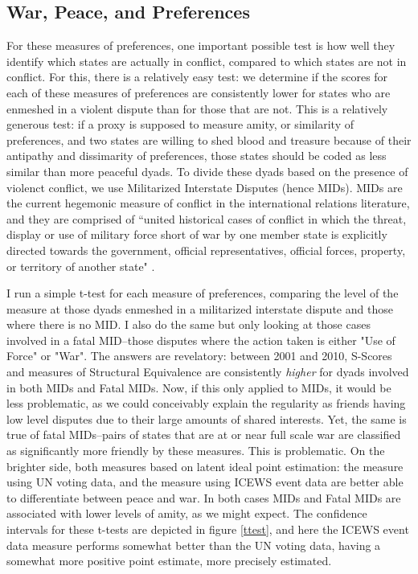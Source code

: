 \documentclass[12pt,onesided,fullpage]{amsart}
\begin{document}
\subsection{War, Peace, and Preferences}
For these measures of preferences, one important possible test is how well they identify which states are actually in conflict, compared to which states are not in conflict. For this, there is a relatively easy test: we determine if the scores for each of these measures of preferences are consistently lower for states who are enmeshed in a violent dispute than for those that are not. This is a relatively generous test: if a proxy is supposed to measure amity, or similarity of preferences, and two states are willing to shed blood and treasure because of their antipathy and dissimarity of preferences, those states should be coded as less similar than more peaceful dyads. To divide these dyads based on the presence of violenct conflict, we use Militarized Interstate Disputes (hence MIDs). MIDs are the current hegemonic measure of conflict in the international relations literature, and they are comprised of ``united historical cases of conflict in which the threat, display or use of military force short of war  by one member state is explicitly directed towards the government, official representatives, official forces, property, or territory of another state" \citep{mids}.

I run a simple t-test for each measure of preferences, comparing the level of the measure at those dyads enmeshed in a militarized interstate dispute and those where there is no MID. I also do the same but only looking at those cases involved in a fatal MID--those disputes where the action taken is either "Use of Force" or "War". The answers are revelatory: between 2001 and 2010, S-Scores and measures of Structural Equivalence are consistently \emph{higher} for dyads involved in both MIDs and Fatal MIDs. Now, if this only applied to MIDs, it would be less problematic, as we could conceivably explain the regularity as friends having low level disputes due to their large amounts of shared interests. Yet, the same is true of fatal MIDs--pairs of states that are at or near full scale war are classified as significantly more friendly by these measures. This is problematic. On the brighter side, both measures based on latent ideal  point estimation: the measure using UN voting data, and the measure using ICEWS event data are better able to differentiate between peace and war. In both cases MIDs and Fatal MIDs are associated with lower levels of amity, as we might expect. The confidence intervals for these t-tests are depicted in figure \ref{ttest}, and here the ICEWS event data measure performs somewhat better than the UN voting data, having a somewhat more positive point estimate, more precisely estimated.
\end{document}
